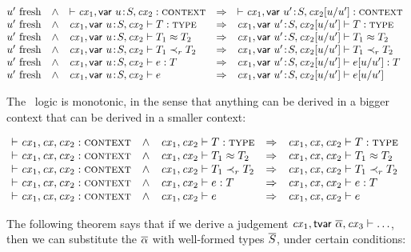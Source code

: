 \begin{theorem}\label{thm-deriv-rename-var}
\[
\begin{array}{@{\fresh{\varI'}\ \ \AND\ \ }l@{\ \ \IMPLIES\ \ }l}
\cxwf{\cxv} &
 \cxwf{\cxvI} \\
\isty{\cxv}{\typ} &
 \isty{\cxvI}{\typ} \\
\teq{\cxv}{\typ_1}{\typ_2} &
 \teq{\cxvI}{\typ_1}{\typ_2} \\
\issub{\cxv}{\typ_1}{\tspred}{\typ_2} &
 \issub{\cxvI}{\typ_1}{\tspred}{\typ_2} \\
\hasty{\cxv}{\expr}{\typ} &
 \hasty{\cxvI}{\esbsren{\expr}}{\typ} \\
\theo{\cxv}{\expr} &
 \theo{\cxvI}{\esbsren{\expr}}
\end{array}
\]
\end{theorem}

The \MS\ logic is monotonic, in the sense that anything can be derived in a
bigger context that can be derived in a smaller context:

\begin{theorem}\label{thm-mono}
\[
\begin{array}{@{\cxwf{\cx_1,\cx,\cx_2}\ \ \AND\ \ }l@{\ \ \IMPLIES\ \ }l}
\isty{\cx_1,\cx_2}{\typ} &
 \isty{\cx_1,\cx,\cx_2}{\typ} \\
\teq{\cx_1,\cx_2}{\typ_1}{\typ_2} &
 \teq{\cx_1,\cx,\cx_2}{\typ_1}{\typ_2} \\
\issub{\cx_1,\cx_2}{\typ_1}{\tspred}{\typ_2} &
 \issub{\cx_1,\cx,\cx_2}{\typ_1}{\tspred}{\typ_2} \\
\hasty{\cx_1,\cx_2}{\expr}{\typ} &
 \hasty{\cx_1,\cx,\cx_2}{\expr}{\typ} \\
\theo{\cx_1,\cx_2}{\expr} &
 \theo{\cx_1,\cx,\cx_2}{\expr}
\end{array}
\]
\end{theorem}

The following theorem says that if we derive a judgement
$\mathit{cx}_1,\mathsf{tvar}\ \overline{\alpha},\mathit{cx}_3\vdash\ldots$, then we can substitute the $\overline{\alpha}$
with well-formed types $\overline{S}$, under certain conditions:

